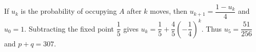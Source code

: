 If $u_k$ is the probability of occupying $A$ after $k$ moves, then $u_{k+1}=\dfrac{1-u_k}{4}$ and $u_0=1$. Subtracting the fixed point $\dfrac{1}{5}$ gives $u_k=\dfrac{1}{5}+\dfrac{4}{5}(-\dfrac{1}{4})^k$. Thus $u_5=\dfrac{51}{256}$ and $\boxed{p+q=307}$.
